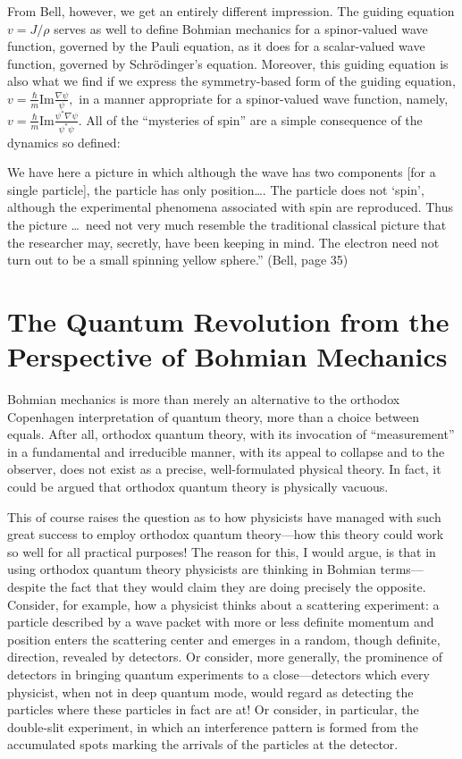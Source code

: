 {}From Bell, however, we get an entirely different impression. The guiding
equation $v=J/\rho$ serves as well to define Bohmian mechanics for a
spinor-valued wave function, governed by the Pauli equation, as it does for
a scalar-valued wave function, governed by Schr\"odinger's equation.
Moreover, this guiding equation is also what we find \cite{survey} if we
express the symmetry-based form of the guiding equation, $v=\frac
{\hbar}m\mbox {Im}\frac{\nabla \psi}{\psi},$ in a manner appropriate for a
spinor-valued wave function, namely, $v=\frac {\hbar}m\mbox
{Im}\frac{\psi^*\nabla
\psi}{\psi^*\psi}$. All of the ``mysteries of spin'' are a simple
consequence of the dynamics so defined:

\bq\noindent We have here a picture in which although the wave has two
components [for a single particle], the particle has only position\dots. The
particle does not `spin', although the experimental phenomena associated
with spin are reproduced. Thus the picture \dots\  need not very much resemble
the traditional classical picture that the researcher may, secretly, have
been keeping in mind. The electron need not turn out to be a small spinning
yellow sphere.'' (Bell, page 35)
\eq

\section*{The Quantum Revolution from the Perspective of Bohmian Mechanics}

Bohmian mechanics is more than merely an alternative to the orthodox
Copenhagen interpretation of quantum theory, more than a choice between
equals. After all, orthodox quantum theory, with its invocation of
``measurement'' in a fundamental and irreducible manner, with its appeal to
collapse and to the observer, does not exist as a precise, well-formulated
physical theory. In fact, it could be argued that orthodox quantum theory is
physically vacuous.

This of course raises the question as to how physicists have managed with
such great success to employ orthodox quantum theory---how this theory
could work so well for all practical purposes! The reason for this, I would
argue, is that in using orthodox quantum theory physicists  are thinking in
Bohmian terms---despite the fact that they would claim they are doing
precisely the opposite. Consider, for example, how a physicist thinks about
a scattering experiment: a particle described by a wave packet with more or
less definite momentum and position enters the scattering center and
emerges in a random, though definite, direction, revealed by detectors.  Or
consider, more generally, the prominence of detectors in bringing quantum
experiments to a close---detectors which every physicist, when not in deep
quantum mode, would regard as detecting the particles where these particles
in fact are at! Or consider, in particular, the double-slit experiment, in
which an interference pattern is formed from the accumulated spots marking
the arrivals of the particles at the detector.

